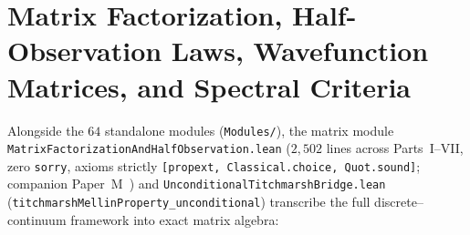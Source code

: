 \documentclass[11pt,a4paper]{article}
\theoremstyle{definition}
\begin{document}
\section{Matrix Factorization, Half-Observation Laws, Wavefunction Matrices, and Spectral Criteria}\label{sec:matrix_wavefunction}

Alongside the $64$ standalone modules (\texttt{Modules/}), the matrix module \texttt{Matrix\allowbreak Factorization\allowbreak And\allowbreak Half\allowbreak Observation.lean} ($2{,}502$ lines across Parts~I--VII, zero \texttt{sorry}, axioms strictly \texttt{[propext, Classical.choice, Quot.sound]}; companion Paper~M~\cite{MunawerPaperM2026}) and \texttt{Unconditional\allowbreak Titchmarsh\allowbreak Bridge.lean} (\texttt{titchmarsh\allowbreak Mellin\allowbreak Property\_\allowbreak unconditional}) transcribe the full discrete--continuum framework into exact matrix algebra:
\end{document}
